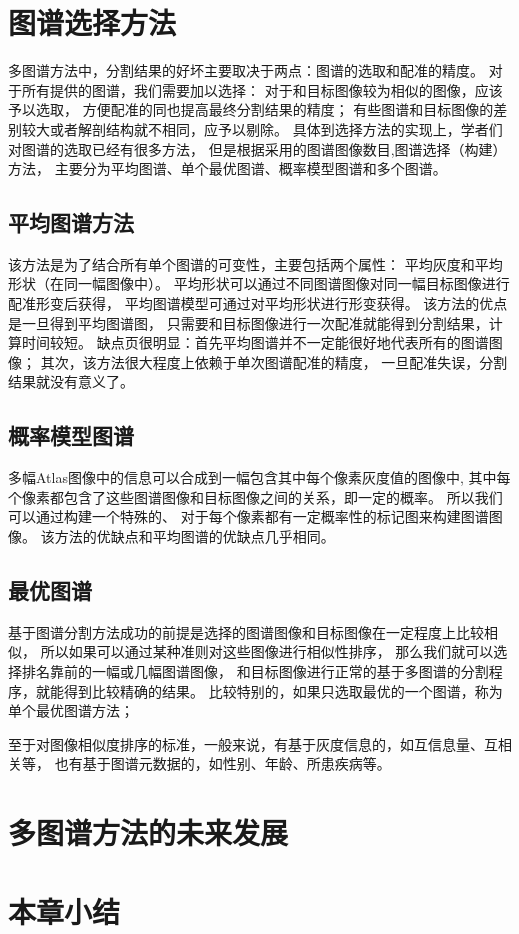 



\section{图谱选择方法}%
多图谱方法中，分割结果的好坏主要取决于两点：图谱的选取和配准的精度。
对于所有提供的图谱，我们需要加以选择：
对于和目标图像较为相似的图像，应该予以选取，
方便配准的同也提高最终分割结果的精度；
有些图谱和目标图像的差别较大或者解剖结构就不相同，应予以剔除。
具体到选择方法的实现上，学者们对图谱的选取已经有很多方法，
但是根据采用的图谱图像数目,图谱选择（构建）方法，
主要分为平均图谱、单个最优图谱、概率模型图谱和多个图谱。

\subsection{平均图谱方法}
该方法是为了结合所有单个图谱的可变性，主要包括两个属性：
平均灰度和平均形状（在同一幅图像中）。
平均形状可以通过不同图谱图像对同一幅目标图像进行配准形变后获得，
平均图谱模型可通过对平均形状进行形变获得。
该方法的优点是一旦得到平均图谱图，
只需要和目标图像进行一次配准就能得到分割结果，计算时间较短。
缺点页很明显：首先平均图谱并不一定能很好地代表所有的图谱图像；
其次，该方法很大程度上依赖于单次图谱配准的精度，
一旦配准失误，分割结果就没有意义了。

\subsection{概率模型图谱}
多幅Atlas图像中的信息可以合成到一幅包含其中每个像素灰度值的图像中,
其中每个像素都包含了这些图谱图像和目标图像之间的关系，即一定的概率。
所以我们可以通过构建一个特殊的、
对于每个像素都有一定概率性的标记图来构建图谱图像。
该方法的优缺点和平均图谱的优缺点几乎相同。

\subsection{最优图谱}
基于图谱分割方法成功的前提是选择的图谱图像和目标图像在一定程度上比较相似，
所以如果可以通过某种准则对这些图像进行相似性排序，
那么我们就可以选择排名靠前的一幅或几幅图谱图像，
和目标图像进行正常的基于多图谱的分割程序，就能得到比较精确的结果。
比较特别的，如果只选取最优的一个图谱，称为单个最优图谱方法；

至于对图像相似度排序的标准，一般来说，有基于灰度信息的，如互信息量、互相关等，
也有基于图谱元数据的，如性别、年龄、所患疾病等。





\section{多图谱方法的未来发展}

\section{本章小结}
